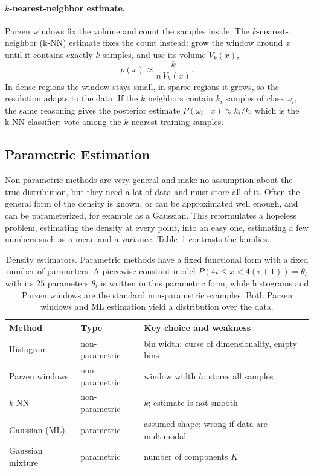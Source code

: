 \paragraph{$k$-nearest-neighbor estimate.}
Parzen windows fix the volume and count the samples inside. The
$k$-nearest-neighbor (k-NN) estimate fixes the count instead: grow the window
around $x$ until it contains exactly $k$ samples, and use its volume $V_k(x)$,
\begin{equation}
  p(x) \approx \frac{k}{n\,V_k(x)} .
\end{equation}
\noindent
In dense regions the window stays small, in sparse regions it grows, so the
resolution adapts to the data. If the $k$ neighbors contain $k_i$ samples of
class $\omega_i$, the same reasoning gives the posterior estimate
$P(\omega_i\mid x)\approx k_i/k$, which is the k-NN classifier: vote among the
$k$ nearest training samples.

\subsection{Parametric Estimation}

Non-parametric methods are very general and make no assumption about the true
distribution, but they need a lot of data and must store all of it. Often the
general form of the density is known, or can be approximated well enough, and
can be parameterized, for example as a Gaussian. This reformulates a hopeless
problem, estimating the density at every point, into an easy one, estimating a
few numbers such as a mean and a variance. Table~\ref{tab:density-methods}
contrasts the families.

\begin{table}[ht]
  \centering
  \begin{tabular}{@{}lp{4.6cm}p{5.6cm}@{}}
    \toprule
    Method & Type & Key choice and weakness \\
    \midrule
    Histogram & non-parametric & bin width; curse of dimensionality, empty bins \\
    Parzen windows & non-parametric & window width $h$; stores all samples \\
    $k$-NN & non-parametric & $k$; estimate is not smooth \\
    Gaussian (ML) & parametric & assumed shape; wrong if data are multimodal \\
    Gaussian mixture & parametric & number of components $K$ \\
    \bottomrule
  \end{tabular}
  \caption{Density estimators. Parametric methods have a fixed functional form
  with a fixed number of parameters. A piecewise-constant model
  $P(4i\le x<4(i+1)) = \theta_i$ with its $25$ parameters $\theta_i$ is written
  in this parametric form, while histograms and Parzen windows are the standard
  non-parametric examples. Both Parzen windows and ML estimation yield a
  distribution over the data.}
  \label{tab:density-methods}
\end{table}

